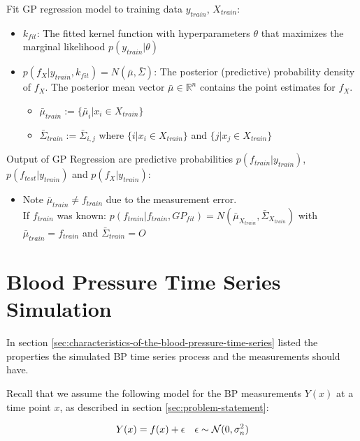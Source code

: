 	Fit GP regression model to training data $y_{train}$, $X_{train}$:
    \begin{itemize}
        \item $k_{fit}$: The fitted kernel function with hyperparameters $\theta$ that maximizes the marginal likelihood
        $p(y_{train}| \theta)$
        \item $p(f_X| y_{train}, k_{fit}) = N(\bar{\mu}, \bar{\Sigma})$:
        The posterior (predictive) probability density of $f_X$. The posterior mean vector
        $\bar{\mu} \in \mathbb{R}^n$ contains the point estimates for $f_X$.
        \begin{itemize}
            \item $\bar{\mu}_{train} := \{\bar{\mu}_i | x_i \in X_{train}\}$
            \item $\bar{\Sigma}_{train} := \bar{\Sigma}_{i,j}$ where $\{i | x_i \in X_{train}\}$ and $\{j | x_j \in X_{train}\}$

        \end{itemize}
    \end{itemize}

	Output of GP Regression are predictive probabilities $p(f_{train}| y_{train})$,
		$p(f_{test}| y_{train})$ and $p(f_{X}| y_{train})$:
			\begin{itemize}
				\item Note $\bar{\mu}_{train} \neq f_{train}$ due to the measurement error. \\ If
				$f_{train}$ was known: $p(f_{train}| f_{train}, GP_{fit}) = N(\bar{\mu}_{X_{train}},
				\bar{\Sigma}_{X_{train}})$
				with $\bar{\mu}_{train} = f_{train}$ and $\bar{\Sigma}_{train} = {\displaystyle O}$
			\end{itemize}

\section{Blood Pressure Time Series Simulation}\label{sec:blood-pressure-time-series-simulation}

In section \ref{sec:characteristics-of-the-blood-pressure-time-series} listed
the properties the simulated BP time series process and the measurements should have.

Recall that we assume the following model for the BP measurements $Y(x)$ at a time point $x$, as
described in section \ref{sec:problem-statement}:

\begin{align*}
    Y(x) = f(x) + \epsilon && \epsilon \sim \operatorname{\mathcal{N}}(0, \sigma_n^{2})
\end{align*}

